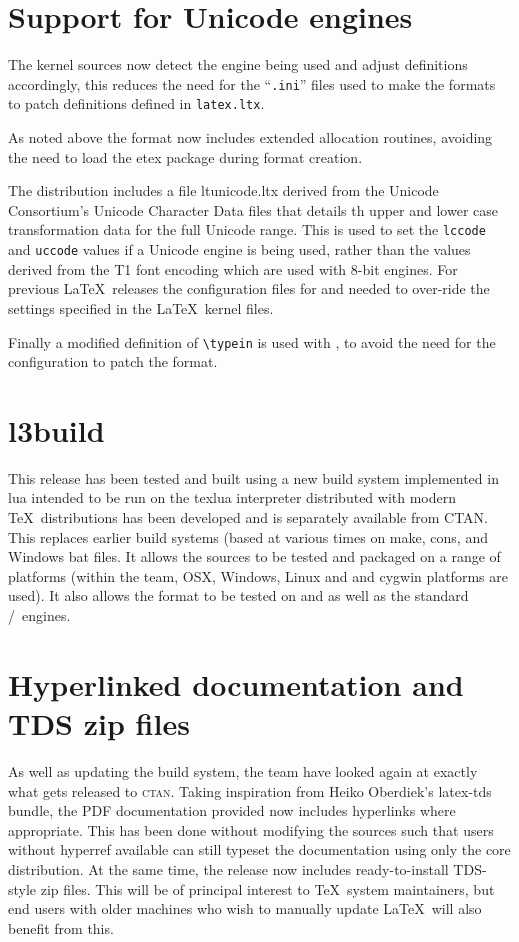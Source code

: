 \documentclass{ltnews}
\begin{document}
\section{Support for Unicode engines}

The kernel sources now detect the engine being used and adjust definitions
accordingly, this reduces the need for the ``\texttt{.ini}'' files used to make
the formats to patch definitions defined in \texttt{latex.ltx}.
 
As noted above the format now includes extended allocation routines, avoiding
the need to load the \textsf{etex} package during format creation.

The distribution includes a file \textsf{ltunicode.ltx} derived from the
Unicode Consortium's Unicode Character Data files that details th upper and
lower case transformation data for the full Unicode range. This is used to set
the \verb|lccode| and \verb|uccode| values if a Unicode engine is being used,
rather than the values derived from the T1 font encoding which are used with
8-bit engines. For previous \LaTeX\ releases the configuration files for
 and  needed to over-ride the settings specified
in the \LaTeX\ kernel files.

Finally a modified definition of \verb|\typein| is used with , to
avoid the need for the  configuration to patch the format.

\section{l3build}

This release has been tested and built using a new build system implemented in
\textsf{lua} intended to be run on the \textsf{texlua} interpreter distributed
with modern \TeX\ distributions has been developed and is separately available
from CTAN. This replaces earlier build systems (based at various times on
\textsf{make}, \textsf{cons}, and Windows \textsf{bat} files. It allows the
sources to be tested and packaged on a range of platforms (within the team,
OSX, Windows, Linux and and cygwin platforms are used). It also allows the
format to be tested on  and  as well as the
standard /\eTeX\ engines.

\section{Hyperlinked documentation and TDS zip files}

As well as updating the build system, the team have looked again at exactly
what gets released to \textsc{ctan}. Taking inspiration from Heiko Oberdiek's
\textsf{latex-tds} bundle, the PDF documentation provided now includes
hyperlinks where appropriate. This has been done without modifying the sources
such that users without \textsf{hyperref} available can still typeset the
documentation using only the core distribution. At the same time, the release
now includes ready-to-install TDS-style zip files. This will be of principal
interest to \TeX\ system maintainers, but end users with older machines who
wish to manually update \LaTeX\ will also benefit from this.
\end{document}
